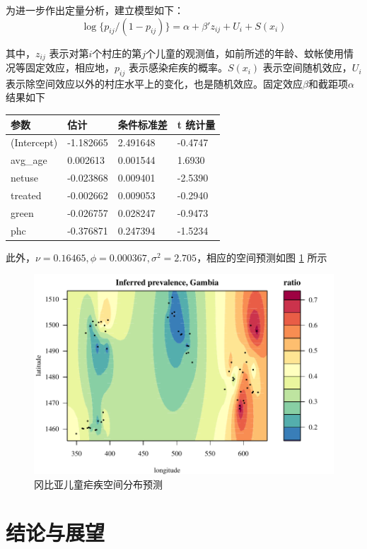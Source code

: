 \documentclass[hyperref, a4paper, UTF8, zihao = -4, linespread = 1.25, scheme = chinese]{ctexbook}
\begin{document}
\newpage

为进一步作出定量分析，建立模型如下：\begin{equation}
\log\{p_{ij}/(1-p_{ij})\} = \alpha + \beta'z_{ij} + U_{i} + S(x_{i})
\end{equation}

其中，\(z_{ij}\)
表示对第\(i\)个村庄的第\(j\)个儿童的观测值，如前所述的年龄、蚊帐使用情况等固定效应，相应地，\(p_{ij}\)
表示感染疟疾的概率。\(S(x_{i})\) 表示空间随机效应，\(U_{i}\)
表示除空间效应以外的村庄水平上的变化，也是随机效应。固定效应\(\beta\)和截距项\(\alpha\)结果如下

\begin{longtable}[]{@{}llll@{}}
\toprule
参数 & 估计 & 条件标准差 & t 统计量\tabularnewline
\midrule
\endhead
(Intercept) & -1.182665 & 2.491648 & -0.4747\tabularnewline
avg\_age & 0.002613 & 0.001544 & 1.6930\tabularnewline
netuse & -0.023868 & 0.009401 & -2.5390\tabularnewline
treated & -0.002662 & 0.009053 & -0.2940\tabularnewline
green & -0.026757 & 0.028247 & -0.9473\tabularnewline
phc & -0.376871 & 0.247394 & -1.5234\tabularnewline
\bottomrule
\end{longtable}

此外，\(\nu = 0.16465,\phi = 0.000367,\sigma^2 = 2.705\)，相应的空间预测如图
\ref{fig:spamm-gambia} 所示

\newpage

\begin{figure}

{\centering \includegraphics[width=0.7\linewidth]{figures/spaMM-gambia} 

}

\caption{冈比亚儿童疟疾空间分布预测}\label{fig:spamm-gambia}
\end{figure}

\hypertarget{summary}{%
\chapter{结论与展望}\label{summary}}
\end{document}
